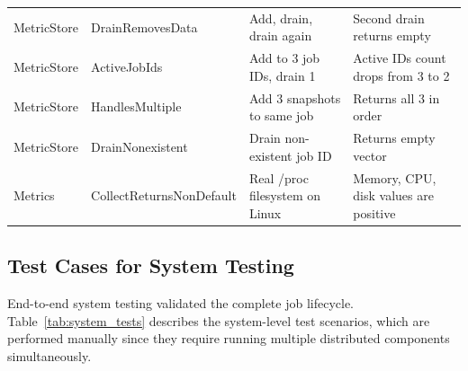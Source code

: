 \begin{table}[htbp]
{\begin{tabular}{llll}
			MetricStore    & DrainRemovesData                             & Add, drain, drain again                                                & Second drain returns empty                                              \\
			MetricStore    & ActiveJobIds                                 & Add to 3 job IDs, drain 1                                              & Active IDs count drops from 3 to 2                                      \\
			MetricStore    & HandlesMultiple                              & Add 3 snapshots to same job                                            & Returns all 3 in order                                                  \\
			MetricStore    & DrainNonexistent                             & Drain non-existent job ID                                              & Returns empty vector                                                    \\
			\midrule
			Metrics        & CollectReturnsNonDefault                     & Real /proc filesystem on Linux                                         & Memory, CPU, disk values are positive                                   \\
			\bottomrule
		\end{tabular}%
	}
\end{table}

\subsection{Test Cases for System Testing}

End-to-end system testing validated the complete job lifecycle. Table~\ref{tab:system_tests} describes the system-level test scenarios, which are performed manually since they require running multiple distributed components simultaneously.

